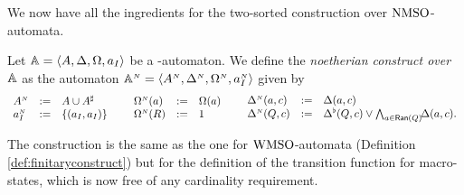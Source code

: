\noindent 
We now have all the ingredients for the two-sorted construction over 
$\mathrm{NMSO}$-automata.

\begin{definition}\label{def:noetherianconstruct}
Let $\mathbb{A} = \langle{A,\Delta,\Omega,a_I}\rangle$ be a {\nmso-automaton}. 
We define the \emph{noetherian construct over $\mathbb{A}$} as the automaton 
$\mathbb{A}^{{\scriptscriptstyle N}} = \langle{A^{{\scriptscriptstyle N}},\Delta^{{\scriptscriptstyle N}},\Omega^{{\scriptscriptstyle N}},a_I^{{\scriptscriptstyle N}}}\rangle$ given
by 
\[
\begin{array}{lll}
   A^{\noet}   &\df&  A \cup \shA
\\ a_I^{\noet} &\df&  \{(a_I,a_I)\}
\end{array}
%
\hspace*{5mm}
%
\begin{array}{lll}
   \pmap^{\noet}(a) &\df& \pmap(a)
\\ \pmap^{\noet}(R) &\df& 1
\end{array}
%
\hspace*{5mm}
%
\begin{array}{lll}
   \tmap^{\noet}(a,c) &\df& \tmap(a,c) 
\\ \tmap^{\noet}(Q,c) &\df&  
  \bmDe(Q,c) \vee \bigwedge_{a \in \Ran(Q)} \! \! \tmap(a,c).
\end{array}
\]
\end{definition}

The construction is the same as the one for $\mathrm{WMSO}$-automata (Definition \ref{def:finitaryconstruct}) but for the definition of the transition function for macro-states, which is now free of any cardinality requirement. %

